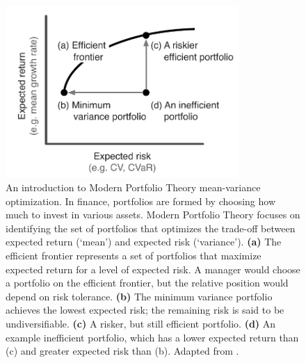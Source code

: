 \begin{figure}[htbp]
\centering \includegraphics[width=3.5in]{efficient-frontier-fig.pdf}
\caption{An introduction to Modern Portfolio Theory mean-variance
  optimization. In finance, portfolios are formed by choosing how much to
  invest in various assets. Modern Portfolio Theory focuses on identifying the
  set of portfolios that optimizes the trade-off between expected return
  (`mean') and expected risk (`variance'). \textbf{(a)} The efficient frontier
  represents a set of portfolios that maximize expected return for a level of
  expected risk. A manager would choose a portfolio on the efficient frontier,
  but the relative position would depend on risk tolerance. \textbf{(b)} The
  minimum variance portfolio achieves the lowest expected risk; the remaining
  risk is said to be undiversifiable. \textbf{(c)} A risker, but still
  efficient portfolio. \textbf{(d)} An example inefficient portfolio, which
  has a lower expected return than (c) and greater expected risk than (b).
  Adapted from \citet{hoekstra2012}.} \label{fig:mpt}
\end{figure}

\clearpage

